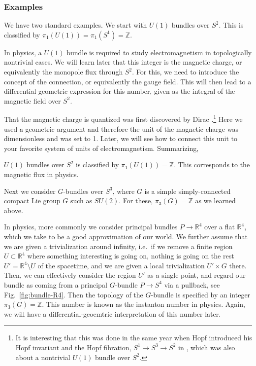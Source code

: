\documentclass[12pt]{article}
\numberwithin{equation}{section}
\theoremstyle{remark}
\def\bR{\mathbb{R}}
\def\bZ{\mathbb{Z}}
\begin{document}
\subsubsection{Examples}

We have two standard examples. We start with 
$U(1)$ bundles over $S^2$.
This is classified by $\pi_1(U(1))=\pi_1(S^1)=\bZ$.

In physics, a $U(1)$ bundle is required to study electromagnetism
in topologically nontrivial cases.
We will learn later that this integer is the magnetic charge,
or equivalently the monopole flux through $S^2$.
For this, we need to introduce the concept of the connection, 
or equivalently the gauge field.
This will then lead to a differential-geometric expression for this number,
given as the integral of the magnetic field over $S^2$.

That the magnetic charge is quantized was first discovered by Dirac \cite{Dirac}.\footnote{%
It is interesting that this was done in the same year when Hopf introduced
his Hopf invariant and the Hopf fibration, $S^1\to S^3\to S^2$ in \cite{Hopf},
which was also about a nontrivial $U(1)$ bundle over $S^2$.}
Here we used a geometric argument and therefore the unit of the magnetic charge was dimensionless and was set to 1.
Later, we will see how to connect this unit to your favorite system of units of electromagnetism.
Summarizing, 
\begin{example}
$U(1)$ bundles over $S^2$ is classified by $\pi_1(U(1))=\bZ$.
This corresponds to the magnetic flux in physics.
\end{example}


Next we consider $G$-bundles over $S^3$,
where $G$ is a simple simply-connected compact Lie group $G$ such as $SU(2)$.
For these, $\pi_3(G)=\bZ$  as we learned above.

In physics,  more commonly we consider  principal bundles $P\to \bR^4$ over a flat $\bR^4$,
which we take to be a good approximation of our world.
We further assume that we are given a trivialization around infinity,
i.e.~if we remove a finite region $U\subset \bR^4$ 
where something interesting is going on,
nothing is going on the rest $U'=\bR^4 \setminus U$ of the spacetime,
and we are given a local trivialization $U'\times G$ there.
Then, we can effectively consider the region $U'$ as a single point,
and regard our bundle as coming from a principal $G$-bundle  $P\to S^4$
via a pullback, see Fig.~\ref{fig:bundle-R4}.
Then the topology of the $G$-bundle is specified by an integer $\pi_3(G)=\bZ$.
This number is known as the instanton number in physics.
Again, we will have a differential-geoemtric interpretation of this number later.
\end{document}
